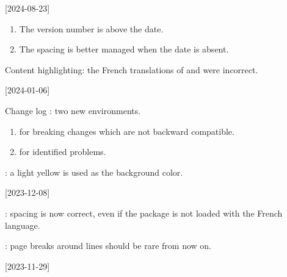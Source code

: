 \tdocsep




[2024-08-23]

\begin{tdocupdate}
    \item {}
    \begin{enumerate}
        \item The version number is above the date.

        \item The spacing is better managed when the date is absent.
    \end{enumerate}
\end{tdocupdate}


\begin{tdocfix}
    \item Content highlighting: the French translations of  and  were incorrect.
\end{tdocfix}

\tdocsep




[2024-01-06]

\begin{tdocnew}
    \item Change log : two new environments.
    \begin{enumerate}
        \item {} for breaking changes which are not backward compatible.

        \item {} for identified problems.
    \end{enumerate}

    \item {}: a light yellow is used as the background color.
\end{tdocnew}

\tdocsep




[2023-12-08]

\begin{tdocfix}
    \item {}: spacing is now correct, even if the  package is not loaded with the French language.

    \item {}: page breaks around  lines should be rare from now on.
\end{tdocfix}

\tdocsep




[2023-11-29]



